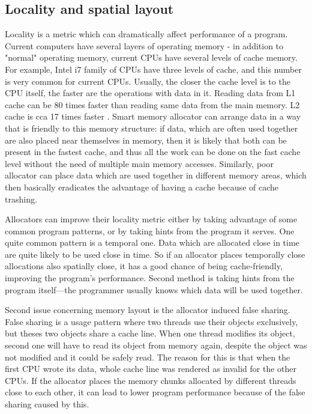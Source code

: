 \subsection{Locality and spatial layout}

Locality is a metric which can dramatically affect performance of a program. Current computers have several layers of operating memory - in addition to "normal" operating memory, current CPUs have several levels of cache memory. For example, Intel i7 family of CPUs have three levels of cache, and this number is very common for current CPUs. Usually, the closer the cache level is to the CPU itself, the faster are the operations with data in it. Reading data from L1 cache can be 80 times faster than reading same data from the main memory. L2 cache is cca 17 times faster \cite{drepper-memory}. Smart memory allocator can arrange data in a way that is friendly to this memory structure: if data, which are often used together are also placed near themselves in memory, then it is likely that both can be present in the fastest cache, and thus all the work can be done on the fast cache level without the need of multiple main memory accesses. Similarly, poor allocator can place data which are used together in different memory areas, which then basically eradicates the advantage of having a cache because of cache trashing.

Allocators can improve their locality metric either by taking advantage of some common program patterns, or by taking hints from the program it serves. One quite common pattern is a temporal one. Data which are allocated close in time are quite likely to be used close in time. So if an allocator places temporally close allocations also spatially close, it has a good chance of being cache-friendly, improving the program's performance. Second method is taking hints from the program itself---the programmer usually knows which data will be used together.

Second issue concerning memory layout is the allocator induced false sharing. False sharing is a usage pattern where two threads use their objects exclusively, but theses two objects share a cache line. When one thread modifies its object, second one will have to read its object from memory again, despite the object was not modified and it could be safely read. The reason for this is that when the first CPU wrote its data, whole cache line was rendered as invalid for the other CPUs. If the allocator places the memory chunks allocated by different threads close to each other, it can lead to lower program performance because of the false sharing caused by this.

